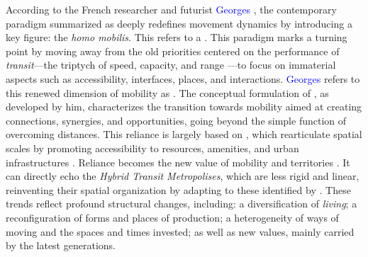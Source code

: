 \begin{refsegment}
According to the French researcher and futurist \textcolor{blue}{Georges} \textcolor{blue}{\textcite[13]{amar_homo_2016}}, the contemporary paradigm summarized as  deeply redefines movement dynamics by introducing a key figure: the \textsl{homo mobilis}. This refers to a . This paradigm marks a turning point by moving away from the old priorities centered on the performance of \textsl{transit}—the triptych of speed, capacity, and range \textcolor{blue}{\autocite[207]{sheller_new_2006}}—to focus on immaterial aspects such as accessibility, interfaces, places, and interactions. \textcolor{blue}{Georges} \textcolor{blue}{\textcite[14]{amar_homo_2016}} refers to this renewed dimension of mobility as . The conceptual formulation of , as developed by him, characterizes the transition towards mobility aimed at creating connections, synergies, and opportunities, going beyond the simple function of overcoming distances. This reliance is largely based on  \textcolor{blue}{\autocite[103, 222]{amar_homo_2016}}, which rearticulate spatial scales by promoting accessibility  to resources, amenities, and urban infrastructures \textcolor{blue}{\autocites{marzloff_trottinette_2019}[2]{silva_proximity-centred_2023}}. Reliance becomes the new value of mobility and territories \textcolor{blue}{\autocite[12, 99]{amar_homo_2016}}. It can directly echo the \textsl{Hybrid Transit Metropolises}, which are less rigid and linear, reinventing their spatial organization by adapting to these  identified by \textcolor{blue}{\textcite[133]{cervero_transit_2020}}. These trends reflect profound structural changes, including: a diversification of \textsl{living}; a reconfiguration of forms and places of production; a heterogeneity of ways of moving and the spaces and times invested; as well as new values, mainly carried by the latest generations.%


\end{refsegment}
